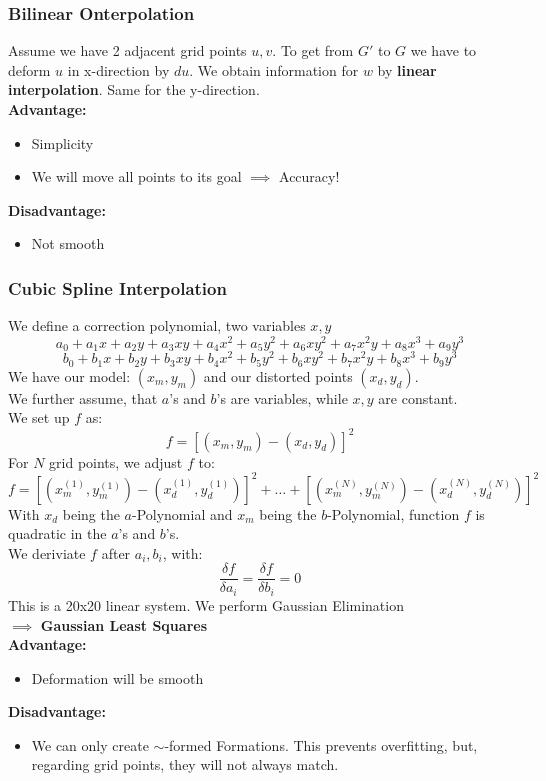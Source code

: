 \documentclass{exerciseBlue}
\begin{document}
\subsubsection{Bilinear Onterpolation}
Assume we have 2 adjacent grid points $u,v$. To get from $G'$ to $G$ we have to deform $u$ in x-direction by $du$. We obtain information for $w$ by \textbf{linear interpolation}. Same for the y-direction.\\
\textbf{Advantage:} \begin{itemize}
	\item Simplicity
	\item We will move all points to its goal $\implies$ Accuracy!
\end{itemize}
\textbf{Disadvantage:} \begin{itemize}
	\item Not smooth
\end{itemize}
\subsubsection{Cubic Spline Interpolation}
We define a correction polynomial, two variables $x,y$
$$a_0 + a_1x+a_2y+a_3xy+a_4x^2+a_5y^2+a_6xy^2+a_7x^2y+a_8x^3 + a_9y^3$$
$$b_0 + b_1x+b_2y+b_3xy+b_4x^2+b_5y^2+b_6xy^2+b_7x^2y+b_8x^3 + b_9y^3$$
We have our model: $(x_m,y_m)$ and our distorted points $(x_d,y_d)$.\\
We further assume, that $a$'s and $b$'s are variables, while $x,y$ are constant.\\
We set up $f$ as:
$$f = [(x_m,y_m)-(x_d,y_d)]^2$$
For $N$ grid points, we adjust $f$ to:
$$f = [(x_m^{(1)},y_m^{(1)})-(x_d^{(1)},y_d^{(1)})]^2 + \dots + [(x_m^{(N)},y_m^{(N)})-(x_d^{(N)},y_d^{(N)})]^2$$
With $x_d$ being the $a$-Polynomial and $x_m$ being the $b$-Polynomial, function $f$ is quadratic in the $a$'s and $b$'s.\\
We deriviate $f$ after $a_i,b_i$, with:\\
$$\dfrac{\delta f}{\delta a_i} =\dfrac{\delta f}{\delta b_i} = 0$$
This is a 20x20 linear system. We perform Gaussian Elimination\\ $\implies$ \textbf{Gaussian Least Squares}\\
\textbf{Advantage:} \begin{itemize}
	\item Deformation will be smooth
\end{itemize}
\textbf{Disadvantage:} \begin{itemize}
	\item We can only create $\sim$-formed Formations. This prevents overfitting, but, regarding grid points, they will not always match.
\end{itemize}
\end{document}
